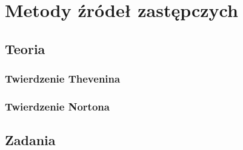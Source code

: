 \chapter{Metody źródeł zastępczych}
\section{Teoria}
\subsection{Twierdzenie Thevenina}
\subsection{Twierdzenie Nortona}

\section{Zadania}


























